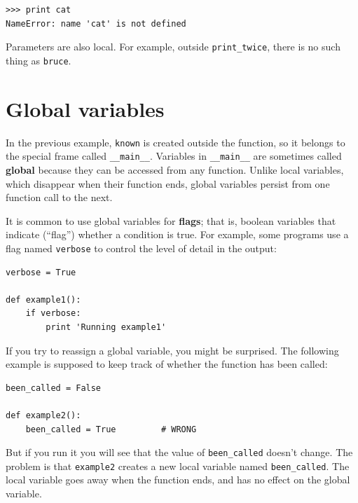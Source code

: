 \documentclass[10pt]{book}
\begin{document}
\beforeverb
\begin{verbatim}
>>> print cat
NameError: name 'cat' is not defined
\end{verbatim}
\afterverb
%
Parameters are also local.
For example, outside \verb"print_twice", there is no
such thing as {\tt bruce}.


\section{Global variables}


In the previous example, {\tt known} is created outside the function,
so it belongs to the special frame called \verb"__main__".
Variables in \verb"__main__" are sometimes called {\bf global}
because they can be accessed from any function.  Unlike local
variables, which disappear when their function ends, global variables
persist from one function call to the next.


It is common to use global variables for {\bf flags}; that is, 
boolean variables that indicate (``flag'') whether a condition
is true.  For example, some programs use
a flag named {\tt verbose} to control the level of detail in the
output:

\beforeverb
\begin{verbatim}
verbose = True

def example1():
    if verbose:
        print 'Running example1'
\end{verbatim}
\afterverb
%
If you try to reassign a global variable, you might be surprised.
The following example is supposed to keep track of whether the
function has been called:


\beforeverb
\begin{verbatim}
been_called = False

def example2():
    been_called = True         # WRONG
\end{verbatim}
\afterverb
%
But if you run it you will see that the value of \verb"been_called"
doesn't change.  The problem is that {\tt example2} creates a new local
variable named \verb"been_called".  The local variable goes away when
the function ends, and has no effect on the global variable.

\end{document}
